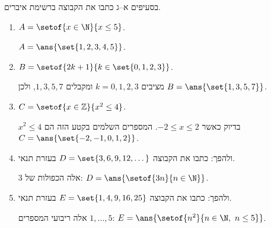 בסעיפים א--ג כתבו את הקבוצה ברשימת איברים.
\begin{enumerate}
\item $A=\setof{x\in\N}{x\le5}$.
\begin{solbox}
$A=\ans{\set{1,2,3,4,5}}$.
\end{solbox}
\item $B=\setof{2k+1}{k\in\set{0,1,2,3}}$.
\begin{solbox}
מציבים $k=0,1,2,3$ ומקבלים $1,3,5,7$, ולכן $B=\ans{\set{1,3,5,7}}$.
\end{solbox}
\item $C=\setof{x\in\mathbb{Z}}{x^2\le4}$.
\begin{solbox}
$x^2\le4$ בדיוק כאשר $-2\le x\le2$. המספרים השלמים בקטע הזה הם $C=\ans{\set{-2,-1,0,1,2}}$.
\end{solbox}
\item ולהפך: כתבו את הקבוצה $D=\set{3,6,9,12,\dots}$ בעזרת תנאי.
\begin{solbox}
אלה הכפולות של 3: $D=\ans{\setof{3n}{n\in\N}}$.
\end{solbox}
\item ולהפך: כתבו את הקבוצה $E=\set{1,4,9,16,25}$ בעזרת תנאי.
\begin{solbox}
אלה ריבועי המספרים $1,\dots,5$: $E=\ans{\setof{n^2}{n\in\N,\ n\le5}}$.
\end{solbox}
\end{enumerate}
